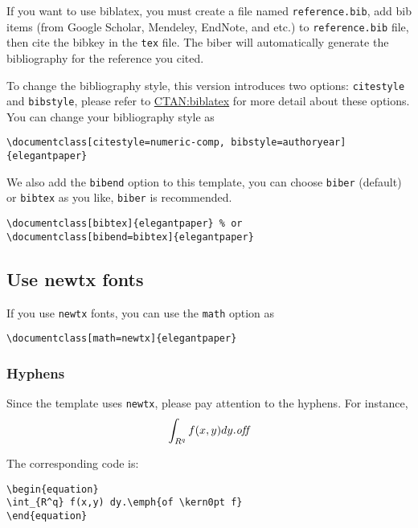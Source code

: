 \documentclass[lang=cn,a4paper,bibend=bibtex]{elegantcs}
\begin{document}
If you want to use biblatex, you must create a file named \lstinline{reference.bib}, add bib items (from Google Scholar, Mendeley, EndNote, and etc.) to \lstinline{reference.bib} file, then cite the bibkey in the \lstinline{tex} file. The biber will automatically generate the bibliography for the reference you cited.


To change the bibliography style, this version introduces two options: \lstinline{citestyle} and \lstinline{bibstyle}, please refer to \href{https://ctan.org/pkg/biblatex}{CTAN:biblatex} for more detail about these options. You can change your bibliography style as

\begin{lstlisting}[style=Latex]
\documentclass[citestyle=numeric-comp, bibstyle=authoryear]{elegantpaper}
\end{lstlisting}

We also add the \lstinline{bibend} option to this template, you can choose \lstinline{biber} (default) or \lstinline{bibtex} as you like, \lstinline{biber} is recommended.

\begin{lstlisting}[style=Latex]
\documentclass[bibtex]{elegantpaper} % or
\documentclass[bibend=bibtex]{elegantpaper}
\end{lstlisting}



\subsection{Use newtx fonts}
If you use \lstinline{newtx} fonts, you can use the \lstinline{math} option as
\begin{lstlisting}[style=Latex]
\documentclass[math=newtx]{elegantpaper}
\end{lstlisting}


\subsubsection{Hyphens}
Since the template uses \lstinline{newtx}, please pay attention to the hyphens. For instance,
\begin{equation}
\int_{R^q} f(x,y) dy.\emph{of\kern0pt f}
\end{equation}

The corresponding code is:
\begin{lstlisting}[style=Latex]
\begin{equation}
\int_{R^q} f(x,y) dy.\emph{of \kern0pt f}
\end{equation}
\end{lstlisting}
\end{document}
